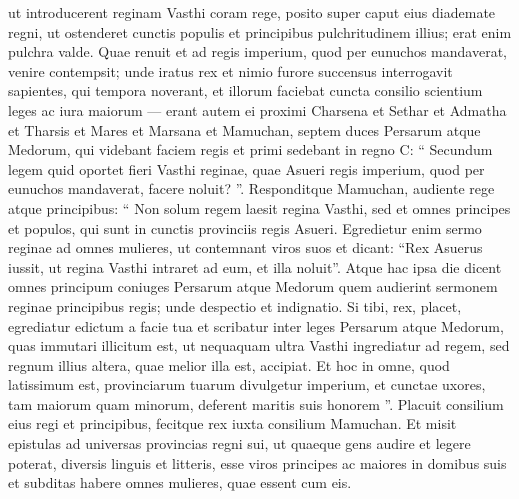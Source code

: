 \begin{biblechapter}
\verse ut introducerent reginam Vasthi coram rege, posito super caput eius diademate regni, ut ostenderet cunctis populis et principibus pulchritudinem illius; erat enim pulchra valde.
 \verse Quae renuit et ad regis imperium, quod per eunuchos mandaverat, venire contempsit; unde iratus rex et nimio furore succensus 
\verse interrogavit sapientes, qui tempora noverant, et illorum faciebat cuncta consilio scientium leges ac iura maiorum — 
\verse erant autem ei proximi Charsena et Sethar et Admatha et Tharsis et Mares et Marsana et Mamuchan, septem duces Persarum atque Medorum, qui videbant faciem regis et primi sedebant in regno C: 
\verse “ Secundum legem quid oportet fieri Vasthi reginae, quae Asueri regis imperium, quod per eunuchos mandaverat, facere noluit? ”.
 \verse Responditque Mamuchan, audiente rege atque principibus: “ Non solum regem laesit regina Vasthi, sed et omnes principes et populos, qui sunt in cunctis provinciis regis Asueri. 
\verse Egredietur enim sermo reginae ad omnes mulieres, ut contemnant viros suos et dicant: “Rex Asuerus iussit, ut regina Vasthi intraret ad eum, et illa noluit”. 
\verse Atque hac ipsa die dicent omnes principum coniuges Persarum atque Medorum quem audierint sermonem reginae principibus regis; unde despectio et indignatio. 
\verse Si tibi, rex, placet, egrediatur edictum a facie tua et scribatur inter leges Persarum atque Medorum, quas immutari illicitum est, ut nequaquam ultra Vasthi ingrediatur ad regem, sed regnum illius altera, quae melior illa est, accipiat. 
\verse Et hoc in omne, quod latissimum est, provinciarum tuarum divulgetur imperium, et cunctae uxores, tam maiorum quam minorum, deferent maritis suis honorem ”.
 \verse Placuit consilium eius regi et principibus, fecitque rex iuxta consilium Mamuchan. 
\verse Et misit epistulas ad universas provincias regni sui, ut quaeque gens audire et legere poterat, diversis linguis et litteris, esse viros principes ac maiores in domibus suis et subditas habere omnes mulieres, quae essent cum eis.
 

\end{biblechapter}
